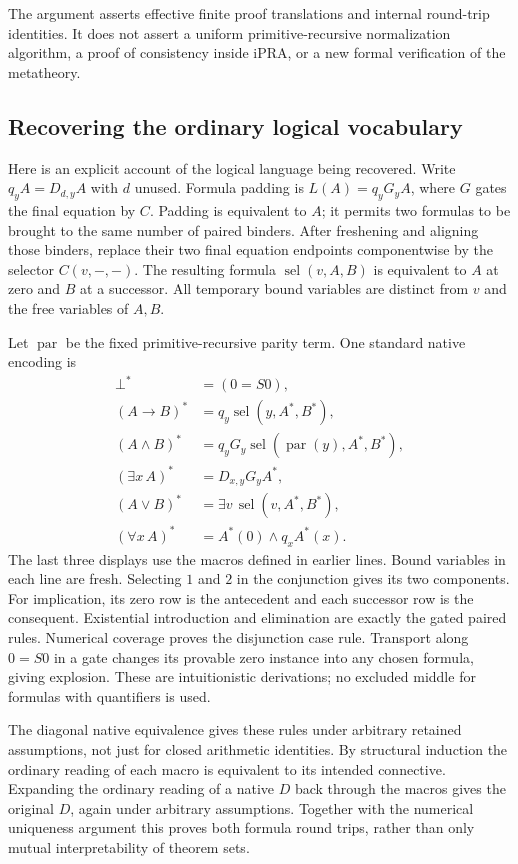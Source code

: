 \documentclass[11pt]{article}
\theoremstyle{definition}\newtheorem{definition}[theorem]{Definition}
\theoremstyle{remark}\newtheorem{remark}[theorem]{Remark}
\begin{document}
The argument asserts effective finite proof translations and internal
round-trip identities. It does not assert a uniform primitive-recursive
normalization algorithm, a proof of consistency inside iPRA, or a new
formal verification of the metatheory.

\subsection{Recovering the ordinary logical vocabulary}

Here is an explicit account of the logical language being recovered.
Write $q_yA=D_{d,y}A$ with $d$ unused. Formula padding is
$L(A)=q_yG_yA$, where $G$ gates the final equation by $C$. Padding is
equivalent to $A$; it permits two formulas to be brought to the same
number of paired binders. After freshening and aligning those binders,
replace their two final equation endpoints componentwise by the selector
$C(v,-,-)$. The resulting formula $\operatorname{sel}(v,A,B)$ is
equivalent to $A$ at zero and $B$ at a successor. All temporary bound
variables are distinct from $v$ and the free variables of $A,B$.

Let $\operatorname{par}$ be the fixed primitive-recursive parity term.
One standard native encoding is
\[
\begin{aligned}
\bot^*&=(0=S0),\\
(A\to B)^*&=q_y\operatorname{sel}(y,A^*,B^*),\\
(A\land B)^*&=q_yG_y\operatorname{sel}(\operatorname{par}(y),A^*,B^*),\\
(\exists x\,A)^*&=D_{x,y}G_yA^*,\\
(A\lor B)^*&=\exists v\,\operatorname{sel}(v,A^*,B^*),\\
(\forall x\,A)^*&=A^*(0)\land q_x A^*(x).
\end{aligned}
\]
The last three displays use the macros defined in earlier lines.
Bound variables in each line are fresh. Selecting $1$ and $2$ in the
conjunction gives its two components. For implication, its zero row is
the antecedent and each successor row is the consequent. Existential
introduction and elimination are exactly the gated paired rules. Numerical
coverage proves the disjunction case rule. Transport along $0=S0$ in
a gate changes its provable zero instance into any chosen formula,
giving explosion. These are intuitionistic derivations; no excluded
middle for formulas with quantifiers is used.

The diagonal native equivalence gives these rules under arbitrary retained
assumptions, not just for closed arithmetic identities. By structural
induction the ordinary reading of each macro is equivalent to its intended
connective. Expanding the ordinary reading of a native $D$ back through
the macros gives the original $D$, again under arbitrary assumptions.
Together with the numerical uniqueness argument this proves both formula
round trips, rather than only mutual interpretability of theorem sets.
\end{document}
